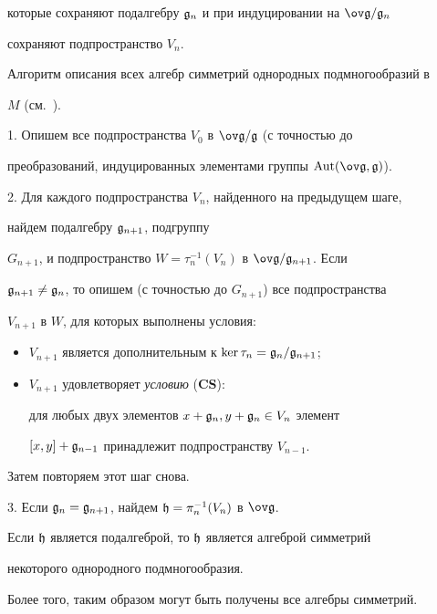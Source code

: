 которые сохраняют подалгебру $\frak g_n$ и при индуцировании на $\gb/\g_n$


сохраняют подпространство $V_n$.





Алгоритм описания всех алгебр симметрий однородных подмногообразий в


$M$ (см.~\cite{nr:nk}).





1. Опишем все подпространства $V_0$ в $\gb/\g$ (с точностью до


преобразований, индуцированных элементами группы $\Aut(\gb,\g)$).





2. Для каждого подпространства $V_n$, найденного на предыдущем шаге,


найдем подалгебру $\frak g_{n+1}$, подгруппу


$G_{n+1}$, и подпространство $W=\tau_n^{-1}(V_n)$ в $\gb/\g_{n+1}$. Если


$\frak g_{n+1}\ne\frak g_n$, то опишем (с точностью до $G_{n+1}$) все подпространства


$V_{n+1}$ в $W$, для которых выполнены условия:


\begin{itemize}


\item[] $V_{n+1}$ является дополнительным к $\ker \tau_n=\frak g_n/\frak g_{n+1}$;


\item[] $V_{n+1}$ удовлетворяет {\it условию} ({\bf CS}):


для любых двух элементов $x+\frak g_n,y+\frak g_n\in V_n$ элемент 


$[x,y]+\frak g_{n-1}$ принадлежит подпространству $V_{n-1}$.


\end{itemize}


Затем повторяем этот шаг снова.





3. Если $\frak g_{n}=\frak g_{n+1}$, найдем $\frak h=\pi_n^{-1}(V_n)$ в $\gb$.


Если $\frak h$ является подалгеброй, то $\frak h$ является алгеброй симметрий 


некоторого однородного подмногообразия.


Более того, таким образом могут быть получены все алгебры симметрий.





